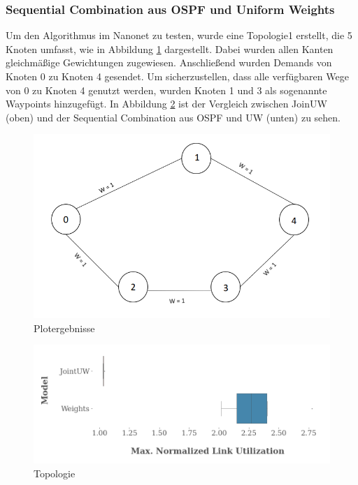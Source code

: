 \documentclass[sigconf, nonacm, review]{acmart}
\begin{document}
\subsubsection{Sequential Combination aus OSPF und Uniform Weights}
Um den Algorithmus im Nanonet zu testen, wurde eine Topologie1 erstellt, 
die 5 Knoten umfasst, wie in Abbildung \ref{fig:naveed_p2_graph} dargestellt. 
Dabei wurden allen Kanten gleichm\"a\ss ige Gewichtungen zugewiesen. 
Anschlie\ss end wurden Demands von Knoten 0 zu Knoten 4 gesendet. 
Um sicherzustellen, dass alle verf\"ugbaren Wege von 0 zu Knoten 4  genutzt werden,
wurden Knoten 1 und 3 als sogenannte Waypoints hinzugef\"ugt.
In Abbildung \ref{fig:naveed_p2_boxplot} ist der Vergleich zwischen JoinUW (oben) und der Sequential Combination aus OSPF und UW (unten) zu sehen.
\begin{figure}
\centering
\includegraphics[width=\linewidth]{figures/naveed_p2_graph.png}
\caption{Plotergebnisse}
\label{fig:naveed_p2_graph}
\end{figure}
\begin{figure}
\centering
\includegraphics[width=\linewidth]{figures/naveed_p2_boxplot.png}
\caption{Topologie}
\label{fig:naveed_p2_boxplot}
\end{figure}
\end{document}
